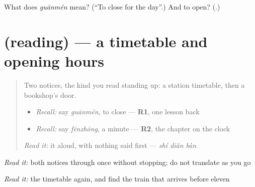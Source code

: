 \begin{tcolorbox}[breakable,colback=teal!4,colframe=teal!35!black,title={Before you move on}]
What does \emph{guānmén} mean? (\textquotedblleft{}To close for the day\textquotedblright{}.) And to open? (\textbf{}.)
\end{tcolorbox}
\section[(reading)]{(reading) — a timetable and opening hours}

\label{lesson:ZH-C155-reading}



\begin{quote}
Two notices, the kind you read standing up: a station timetable, then a bookshop's door.

\begin{itemize}
\raggedright
  \item \emph{Recall:} say \emph{guānmén}, to close — \textbf{R1}, one lesson back
  \item \emph{Recall:} say \emph{fēnzhōng}, a minute — \textbf{R2}, the chapter on the clock
\end{itemize}

\begin{quote}
\end{quote}

\emph{Read it:} it aloud, with nothing said first — \emph{shí diǎn bàn}
\end{quote}

\begin{tcolorbox}[breakable,skin=enhanced,colback=orange!6,colframe=orange!45!black,boxrule=0.5pt,arc=1mm,left=6pt,right=6pt,top=4pt,bottom=4pt,fonttitle=\bfseries,title={Read this}]
\begin{quote}
      
\end{quote}

\begin{quote}
     
\end{quote}

\emph{Read it:} both notices through once without stopping; do not translate as you go

\emph{Read it:} the timetable again, and find the train that arrives before eleven
\end{tcolorbox}


